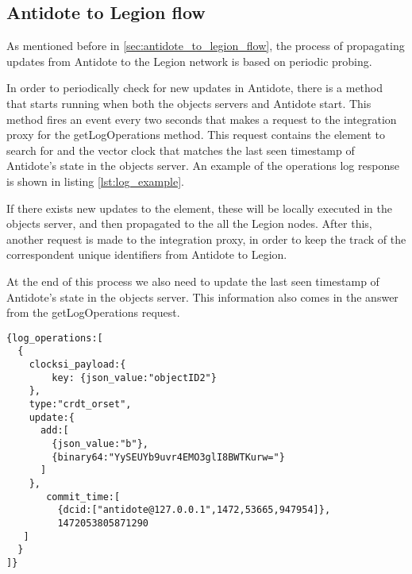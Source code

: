 \subsection{Antidote to Legion flow}
\label{sec:legion_changes_antidote to legion flow}
As mentioned before in \ref{sec:antidote_to_legion_flow}, the process of propagating updates from Antidote to the Legion network is based on periodic probing.\par
	In order to periodically check for new updates in Antidote, there is a method that starts running when both the objects servers and Antidote start. This method fires an event every two seconds that makes a request to the integration proxy for the getLogOperations method. This request contains the element to search for and the vector clock that matches the last seen timestamp of Antidote's state in the objects server. An example of  the operations log response is shown in listing \ref{lst:log_example}.\par
	If there exists new updates to the element, these will be locally executed in the objects server, and then propagated to the all the Legion nodes. After this, another request is made to the integration proxy, in order to keep the track of the correspondent unique identifiers from Antidote to Legion.\par
	At the end of this process we also need to update the last seen timestamp of Antidote's state in the objects server. This information also comes in the answer from the getLogOperations request.
	
\begin{lstlisting}[caption={Antidote log response example},label={lst:log_example}]
{log_operations:[
  {
    clocksi_payload:{
        key: {json_value:"objectID2"}
    },
    type:"crdt_orset",
    update:{
      add:[
        {json_value:"b"},
        {binary64:"YySEUYb9uvr4EMO3glI8BWTKurw="}
      ]
    },
       commit_time:[
         {dcid:["antidote@127.0.0.1",1472,53665,947954]},
         1472053805871290
   ]
  }
]}
\end{lstlisting}

